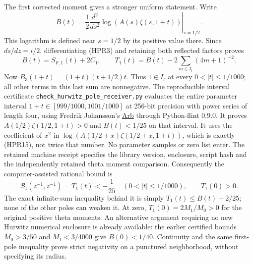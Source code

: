 The first corrected moment gives a stronger uniform statement.
Write
\begin{equation}\tag{HPR15}
 B(t)=\frac12\left.\frac{d^2}{ds^2}
               \log(A(s)\zeta(s,1+t))\right|_{s=1/2}.
\end{equation}
This logarithm is defined near $s=1/2$ by its positive value there.
Since $ds/dz=i/2$, differentiating (HPR3) and retaining both reflected
factors proves
\begin{equation}\tag{HPR16}
 B(t)=S_{F,1}(t)+2C_1,\qquad
 T_1(t)=B(t)-2\sum_{m\in I_t}(4m+1)^{-2}.
\end{equation}
Now $B_3(1+t)=(1+t)(t+1/2)t$. Thus $1\in I_t$ at every
$0<|t|\le1/1000$; all other terms in this last sum are nonnegative.
The reproducible interval certificate
\nolinkurl{check_hurwitz_pole_receiver.py} evaluates the entire
parameter interval $1+t\in[999/1000,1001/1000]$ at 256-bit precision
with power series of length four, using Fredrik Johansson's
\href{https://arblib.org/}{Arb} through Python-flint 0.9.0. It proves
$A(1/2)\zeta(1/2,1+t)>0$ and $B(t)<1/25$ on that interval.
It uses the coefficient of $x^2$ in
$\log(A(1/2+x)\zeta(1/2+x,1+t))$, which is exactly (HPR15),
not twice that number. No parameter samples or zero list enter.
The retained machine receipt specifies the library version, enclosure,
script hash and the independently retained theta moment comparison.
Consequently the computer-assisted rational bound is
\begin{equation}\tag{HPR17}
 \boxed{\mathcal B_t(z^{-1},z^{-1})=T_1(t)<-\frac1{25}
                \quad(0<|t|\le1/1000),\qquad T_1(0)>0.}
\end{equation}
The exact infinite-sum inequality behind it is simply
$T_1(t)\le B(t)-2/25$; none of the other poles can weaken it.
At zero, $T_1(0)=2M_1/M_0>0$ for the original positive theta moments.
An alternative argument requiring no new Hurwitz numerical enclosure
is already available: the earlier certified bounds
$M_0>3/50$ and $M_1<3/4000$ give $B(0)<1/40$.
Continuity and the same first-pole inequality prove strict negativity
on a punctured neighborhood, without specifying its radius.


